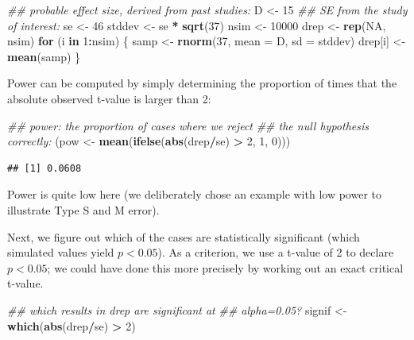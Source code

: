 \documentclass[12pt,]{krantz}
\newenvironment{Shaded}{\begin{snugshade}}{\end{snugshade}}
\newcommand{\CommentTok}[1]{\textcolor[rgb]{0.56,0.35,0.01}{\textit{#1}}}
\newcommand{\ControlFlowTok}[1]{\textcolor[rgb]{0.13,0.29,0.53}{\textbf{#1}}}
\newcommand{\DataTypeTok}[1]{\textcolor[rgb]{0.13,0.29,0.53}{#1}}
\newcommand{\DecValTok}[1]{\textcolor[rgb]{0.00,0.00,0.81}{#1}}
\newcommand{\KeywordTok}[1]{\textcolor[rgb]{0.13,0.29,0.53}{\textbf{#1}}}
\newcommand{\NormalTok}[1]{#1}
\newcommand{\OperatorTok}[1]{\textcolor[rgb]{0.81,0.36,0.00}{\textbf{#1}}}
\newcommand{\OtherTok}[1]{\textcolor[rgb]{0.56,0.35,0.01}{#1}}
\newcommand{\StringTok}[1]{\textcolor[rgb]{0.31,0.60,0.02}{#1}}
\begin{document}
\begin{Shaded}
\begin{Highlighting}[]
\CommentTok{## probable effect size, derived from past studies:}
\NormalTok{D <-}\StringTok{ }\DecValTok{15}
\CommentTok{## SE from the study of interest:}
\NormalTok{se <-}\StringTok{ }\DecValTok{46}
\NormalTok{stddev <-}\StringTok{ }\NormalTok{se }\OperatorTok{*}\StringTok{ }\KeywordTok{sqrt}\NormalTok{(}\DecValTok{37}\NormalTok{)}
\NormalTok{nsim <-}\StringTok{ }\DecValTok{10000}
\NormalTok{drep <-}\StringTok{ }\KeywordTok{rep}\NormalTok{(}\OtherTok{NA}\NormalTok{, nsim)}
\ControlFlowTok{for}\NormalTok{ (i }\ControlFlowTok{in} \DecValTok{1}\OperatorTok{:}\NormalTok{nsim) \{}
\NormalTok{  samp <-}\StringTok{ }\KeywordTok{rnorm}\NormalTok{(}\DecValTok{37}\NormalTok{, }\DataTypeTok{mean =}\NormalTok{ D, }\DataTypeTok{sd =}\NormalTok{ stddev)}
\NormalTok{  drep[i] <-}\StringTok{ }\KeywordTok{mean}\NormalTok{(samp)}
\NormalTok{\}}
\end{Highlighting}
\end{Shaded}

Power can be computed by simply determining the proportion of times that the absolute observed t-value is larger than 2:

\begin{Shaded}
\begin{Highlighting}[]
\CommentTok{## power: the proportion of cases where we reject}
\CommentTok{## the null hypothesis correctly:}
\NormalTok{(pow <-}\StringTok{ }\KeywordTok{mean}\NormalTok{(}\KeywordTok{ifelse}\NormalTok{(}\KeywordTok{abs}\NormalTok{(drep}\OperatorTok{/}\NormalTok{se) }\OperatorTok{>}\StringTok{ }\DecValTok{2}\NormalTok{, }\DecValTok{1}\NormalTok{, }\DecValTok{0}\NormalTok{)))}
\end{Highlighting}
\end{Shaded}

\begin{verbatim}
## [1] 0.0608
\end{verbatim}

Power is quite low here (we deliberately chose an example with low power to illustrate Type S and M error).

Next, we figure out which of the cases are statistically significant (which simulated values yield \(p<0.05\)). As a criterion, we use a t-value of 2 to declare \(p<0.05\); we could have done this more precisely by working out an exact critical t-value.

\begin{Shaded}
\begin{Highlighting}[]
\CommentTok{## which results in drep are significant at}
\CommentTok{## alpha=0.05?}
\NormalTok{signif <-}\StringTok{ }\KeywordTok{which}\NormalTok{(}\KeywordTok{abs}\NormalTok{(drep}\OperatorTok{/}\NormalTok{se) }\OperatorTok{>}\StringTok{ }\DecValTok{2}\NormalTok{)}
\end{Highlighting}
\end{Shaded}
\end{document}
